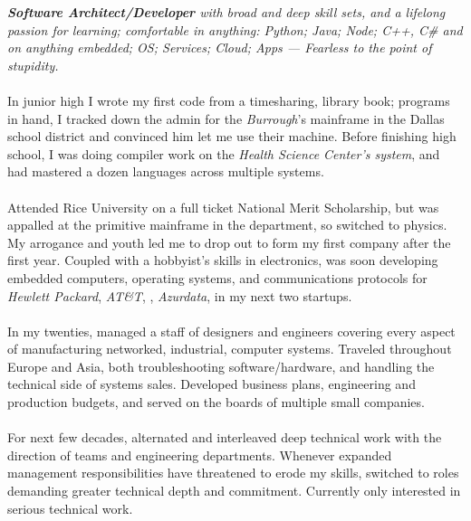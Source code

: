 \documentclass[10pt,letterpaper]{article}
\begin{document}
\vspace{-1.3em}  %
\begin{multicols}{2}  %
\noindent \emph{\textbf{Software Architect/Developer} with broad and deep skill sets, and a lifelong passion for learning; comfortable in anything: Python; Java; Node; C++, C\# and on anything embedded; OS; Services; Cloud; Apps --- Fearless to the point of stupidity.}
\\
\\
In junior high I wrote my first code from a \textit{} timesharing, library book; programs in hand, I tracked down the admin for the \textit{Burrough}'s mainframe in the Dallas school district and convinced him let me use their machine. Before finishing high school, I was doing compiler work on the \textit{ Health Science Center's system}, and had mastered a dozen languages across multiple systems.
\\
\\
Attended Rice University on a full ticket National Merit Scholarship, but was appalled at the primitive  mainframe in the  department, so switched to physics. My arrogance and youth led me to drop out to form my first company after the first year. Coupled with a hobbyist's skills in electronics, was soon developing embedded computers, operating systems, and communications protocols for \textit{Hewlett Packard}, \textit{AT\&T}, \textit{}, \textit{Azurdata}, in my next two startups.
\\
\\
In my twenties, managed a staff of designers and engineers covering every aspect of manufacturing networked, industrial, computer systems. Traveled throughout Europe and Asia, both troubleshooting software/hardware, and handling the technical side of systems sales. Developed business plans, engineering and production budgets, and served on the boards of multiple small companies.
\\
\\
For next few decades, alternated and interleaved deep technical work with the direction of teams and engineering departments. Whenever expanded management responsibilities have threatened to erode my skills, switched to roles demanding greater technical depth and commitment. Currently only interested in serious technical work.
\\
\\
\end{multicols}
\end{document}
